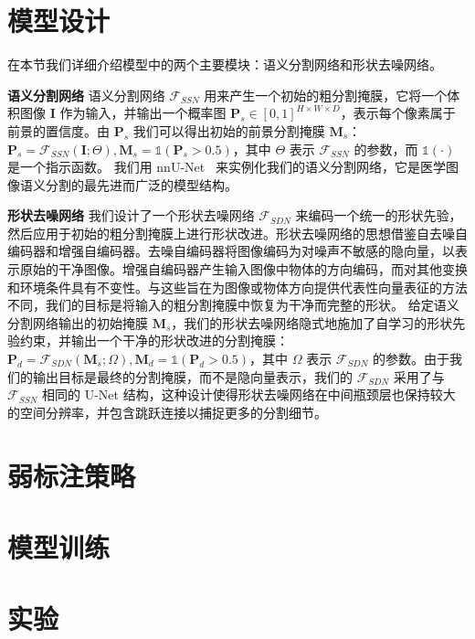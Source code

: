 \section{模型设计}
在本节我们详细介绍模型中的两个主要模块：语义分割网络和形状去噪网络。

\textbf{语义分割网络} \quad 语义分割网络 $\mathcal{F}_{SSN}$ 用来产生一个初始的粗分割掩膜，它将一个体积图像 $\mathbf{I}$ 作为输入，并输出一个概率图 $\mathbf{P}_s \in [0,1]^{H\times W\times D}$，表示每个像素属于前景的置信度。由 $\mathbf{P}_s$ 我们可以得出初始的前景分割掩膜 $\mathbf{M}_s$：$\mathbf{P}_s = \mathcal{F}_{SSN} (\mathbf{I}; \Theta), \mathbf{M}_s = \mathds{1} (\mathbf{P}_s > 0.5)$，其中 $\Theta$ 表示 $\mathcal{F}_{SSN}$ 的参数，而 $\mathds{1}(\cdot)$ 是一个指示函数。
我们用 nnU-Net~\citep{isensee2019automated} 来实例化我们的语义分割网络，它是医学图像语义分割的最先进而广泛的模型结构。


\textbf{形状去噪网络}  \quad 我们设计了一个形状去噪网络 $\mathcal{F}_{SDN}$ 来编码一个统一的形状先验，然后应用于初始的粗分割掩膜上进行形状改进。形状去噪网络的思想借鉴自去噪自编码器\citep{vincent2010stacked}和增强自编码器\citep{Sundermeyer_2018_ECCV}。去噪自编码器将图像编码为对噪声不敏感的隐向量，以表示原始的干净图像。增强自编码器产生输入图像中物体的方向编码，而对其他变换和环境条件具有不变性。与这些旨在为图像或物体方向提供代表性向量表征的方法不同，我们的目标是将输入的粗分割掩膜中恢复为干净而完整的形状。
给定语义分割网络输出的初始掩膜 $\mathbf{M}_s$，我们的形状去噪网络隐式地施加了自学习的形状先验约束，并输出一个干净的形状改进的分割掩膜：$\mathbf{P}_d = \mathcal{F}_{SDN} (\mathbf{M}_s; \Omega), \mathbf{M}_d = \mathds{1} (\mathbf{P}_d > 0.5)$，其中 $\Omega$ 表示 $\mathcal{F}_{SDN}$ 的参数。由于我们的输出目标是最终的分割掩膜，而不是隐向量表示，我们的 $\mathcal{F}_{SDN}$ 采用了与 $\mathcal{F}_{SSN}$ 相同的 U-Net 结构，这种设计使得形状去噪网络在中间瓶颈层也保持较大的空间分辨率，并包含跳跃连接以捕捉更多的分割细节。

\section{弱标注策略}



\section{模型训练}



\section{实验}



